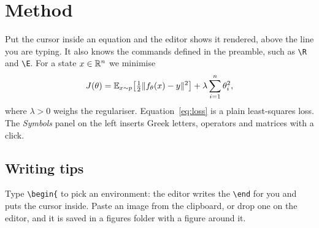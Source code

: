 \section{Method}
\label{sec:method}

Put the cursor inside an equation and the editor shows it rendered, above the line you are typing. It also knows the
commands defined in the preamble, such as \verb|\R| and \verb|\E|. For a state $x \in \mathbb{R}^n$ we minimise
\begin{equation}
  J(\theta) = \mathbb{E}_{x \sim p}\!\left[ \tfrac{1}{2} \lVert f_\theta(x) - y \rVert^2 \right]
            + \lambda \sum_{i=1}^{n} \theta_i^2 ,
  \label{eq:loss}
\end{equation}
where $\lambda > 0$ weighs the regulariser. Equation~\eqref{eq:loss} is a plain least-squares loss. The \emph{Symbols}
panel on the left inserts Greek letters, operators and matrices with a click.

\subsection{Writing tips}

Type \verb|\begin{| to pick an environment: the editor writes the \verb|\end| for you and puts the cursor inside.
Paste an image from the clipboard, or drop one on the editor, and it is saved in a figures folder with a figure
around it.
